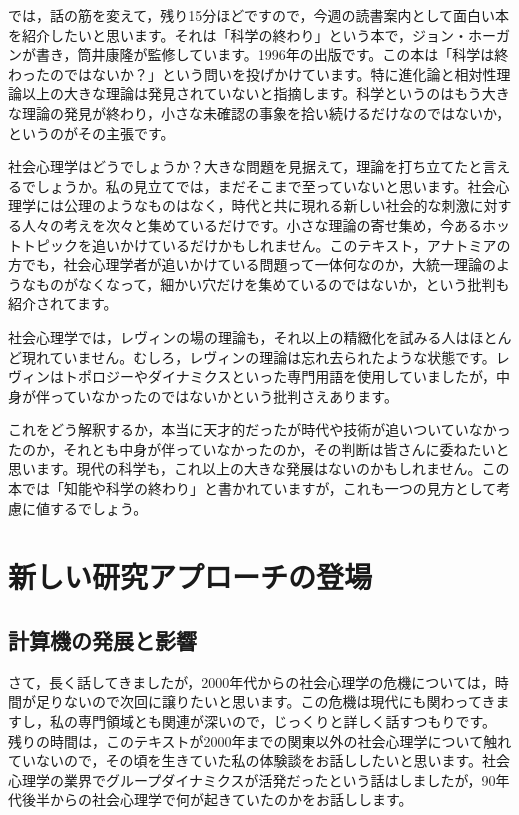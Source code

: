\documentclass{ltjsbook}
\begin{document}
では，話の筋を変えて，残り15分ほどですので，今週の読書案内として面白い本を紹介したいと思います。それは「科学の終わり」\parencite{theEndOfScience}という本で，ジョン・ホーガンが書き，筒井康隆が監修しています。1996年の出版です。この本は「科学は終わったのではないか？」という問いを投げかけています。特に進化論と相対性理論以上の大きな理論は発見されていないと指摘します。科学というのはもう大きな理論の発見が終わり，小さな未確認の事象を拾い続けるだけなのではないか，というのがその主張です。

社会心理学はどうでしょうか？大きな問題を見据えて，理論を打ち立てたと言えるでしょうか。私の見立てでは，まだそこまで至っていないと思います。社会心理学には公理のようなものはなく，時代と共に現れる新しい社会的な刺激に対する人々の考えを次々と集めているだけです。小さな理論の寄せ集め，今あるホットトピックを追いかけているだけかもしれません。このテキスト，アナトミア\parencite{anatomia}の方でも，社会心理学者が追いかけている問題って一体何なのか，大統一理論のようなものがなくなって，細かい穴だけを集めているのではないか，という批判も紹介されてます。

社会心理学では，レヴィンの場の理論も，それ以上の精緻化を試みる人はほとんど現れていません。むしろ，レヴィンの理論は忘れ去られたような状態です。レヴィンはトポロジーやダイナミクスといった専門用語を使用していましたが，中身が伴っていなかったのではないかという批判さえあります。

これをどう解釈するか，本当に天才的だったが時代や技術が追いついていなかったのか，それとも中身が伴っていなかったのか，その判断は皆さんに委ねたいと思います。現代の科学も，これ以上の大きな発展はないのかもしれません。この本では「知能や科学の終わり」と書かれていますが，これも一つの見方として考慮に値するでしょう。

\section{新しい研究アプローチの登場}
\subsection{計算機の発展と影響}
さて，長く話してきましたが，2000年代からの社会心理学の危機については，時間が足りないので次回に譲りたいと思います。この危機は現代にも関わってきますし，私の専門領域とも関連が深いので，じっくりと詳しく話すつもりです。
残りの時間は，このテキストが2000年までの関東以外の社会心理学について触れていないので，その頃を生きていた私の体験談をお話ししたいと思います。社会心理学の業界でグループダイナミクスが活発だったという話はしましたが，90年代後半からの社会心理学で何が起きていたのかをお話しします。
\end{document}
